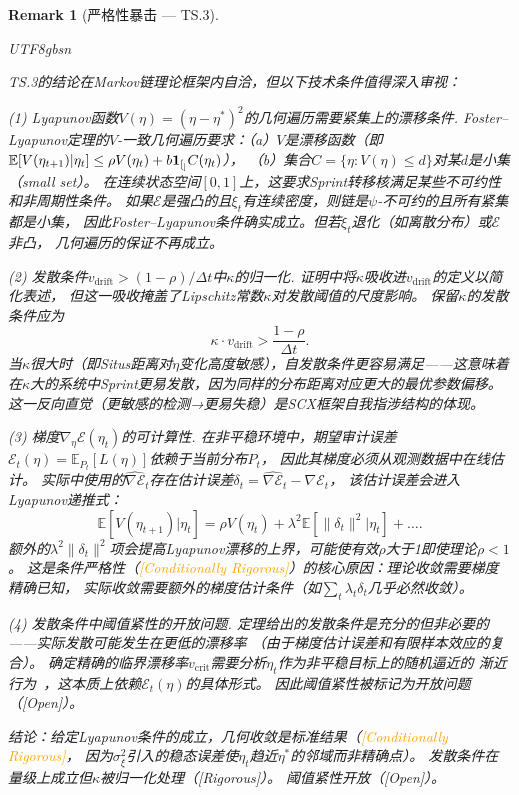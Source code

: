 \documentclass[12pt,a4paper]{article}
\newtheorem{remark}[theorem]{Remark}
\newcommand{\rigorous}{\textcolor{green!50!black}{\small\textsf{[Rigorous]}}}
\newcommand{\conditionallyrigorous}{\textcolor{orange}{\small\textsf{[Conditionally Rigorous]}}}
\newcommand{\openquest}{\textcolor{red!70!black}{\small\textsf{[Open]}}}
\newcommand{\E}{\mathbb{E}}
\newcommand{\ind}[1]{\mathbf{1}_{[#1]}}
\begin{document}
\medskip\noindent
\begin{remark}[严格性暴击 --- TS.3]
\label{crit:ts3}
\begin{CJK}{UTF8}{gbsn}

TS.3的结论在Markov链理论框架内自洽，但以下技术条件值得深入审视：

\emph{(1) Lyapunov函数$V(\eta) = (\eta - \eta^*)^2$的几何遍历需要紧集上的漂移条件.}
Foster--Lyapunov定理的$V$-一致几何遍历要求：（a）$V$是漂移函数（即$\E[V(\eta_{t+1})|\eta_t] \le \rho V(\eta_t) + b\ind_C(\eta_t)$），
（b）集合$C = \{\eta: V(\eta) \le d\}$对某$d$是小集（small set）。
在连续状态空间$[0,1]$上，这要求Sprint转移核满足某些不可约性和非周期性条件。
如果$\mathcal{E}$是强凸的且$\xi_t$有连续密度，则链是$\psi$-不可约的且所有紧集都是小集，
因此Foster--Lyapunov条件确实成立。但若$\xi_t$退化（如离散分布）或$\mathcal{E}$非凸，
几何遍历的保证不再成立。

\emph{(2) 发散条件$v_{\text{drift}} > (1-\rho)/\Delta t$中$\kappa$的归一化.}
证明中将$\kappa$吸收进$v_{\text{drift}}$的定义以简化表述，
但这一吸收掩盖了Lipschitz常数$\kappa$对发散阈值的尺度影响。
保留$\kappa$的发散条件应为
\[
\kappa\cdot v_{\text{drift}} > \frac{1-\rho}{\Delta t}.
\]
当$\kappa$很大时（即Situs距离对$\eta$变化高度敏感），自发散条件更容易满足——这意味着
在$\kappa$大的系统中Sprint更易发散，因为同样的分布距离对应更大的最优参数偏移。
这一反向直觉（更敏感的检测→更易失稳）是SCX框架自我指涉结构的体现。

\emph{(3) 梯度$\nabla_\eta\mathcal{E}(\eta_t)$的可计算性.}
在非平稳环境中，期望审计误差$\mathcal{E}_t(\eta) = \E_{P_t}[L(\eta)]$依赖于当前分布$P_t$，
因此其梯度必须从观测数据中在线估计。
实际中使用的$\widehat{\nabla\mathcal{E}}_t$存在估计误差$\delta_t = \widehat{\nabla\mathcal{E}}_t - \nabla\mathcal{E}_t$，
该估计误差会进入Lyapunov递推式：
\[
\E[V(\eta_{t+1})|\eta_t] = \rho V(\eta_t) + \lambda^2\E[\|\delta_t\|^2|\eta_t] + \dots.
\]
额外的$\lambda^2\|\delta_t\|^2$项会提高Lyapunov漂移的上界，可能使有效$\rho$大于1即使理论$\rho<1$。
这是条件严格性（\conditionallyrigorous）的核心原因：理论收敛需要梯度精确已知，
实际收敛需要额外的梯度估计条件（如$\sum_t \lambda_t \delta_t$几乎必然收敛）。

\emph{(4) 发散条件中阈值紧性的开放问题.}
定理给出的发散条件是充分的但非必要的——实际发散可能发生在更低的漂移率
（由于梯度估计误差和有限样本效应的复合）。
确定精确的临界漂移率$v_{\text{crit}}$需要分析$\eta_t$作为非平稳目标上的随机逼近的
渐近行为~\citep{benveniste1990adaptive}，这本质上依赖$\mathcal{E}_t(\eta)$的具体形式。
因此阈值紧性被标记为开放问题（\openquest）。

\emph{结论：}给定Lyapunov条件的成立，几何收敛是标准结果（\conditionallyrigorous，
因为$\sigma_\xi^2$引入的稳态误差使$\eta_t$趋近$\eta^*$的邻域而非精确点）。
发散条件在量级上成立但$\kappa$被归一化处理（\rigorous）。
阈值紧性开放（\openquest）。
\end{CJK}
\end{remark}
\end{document}
